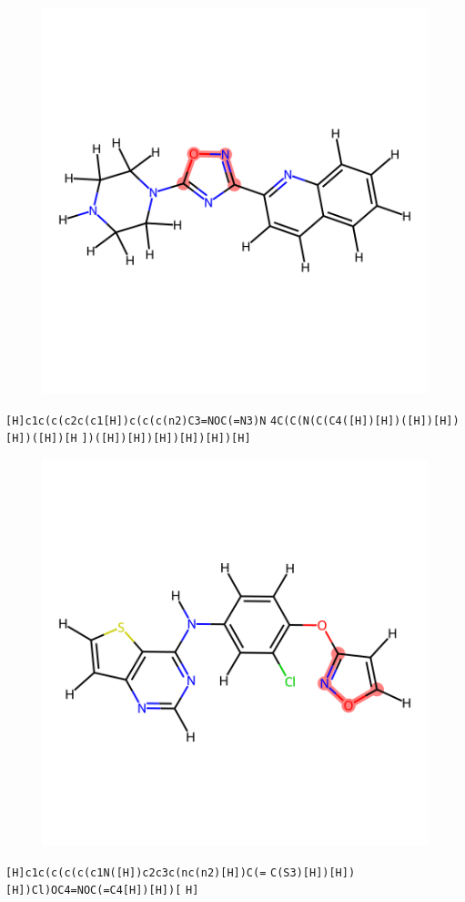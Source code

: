 \documentclass{article}
\begin{document}
\begin{figure}[ht]
\centering
    \includegraphics{mol288.png}
\end{figure}
\verb|[H]c1c(c(c2c(c1[H])c(c(c(n2)C3=NOC(=N3)N| \verb|4C(C(N(C(C4([H])[H])([H])[H])[H])([H])[H| \verb|])([H])[H])[H])[H])[H])[H]|

\begin{figure}[ht]
\centering
    \includegraphics{mol289.png}
\end{figure}
\verb|[H]c1c(c(c(c(c1N([H])c2c3c(nc(n2)[H])C(=| \verb|C(S3)[H])[H])[H])Cl)OC4=NOC(=C4[H])[H])[| \verb|H]|
\end{document}
